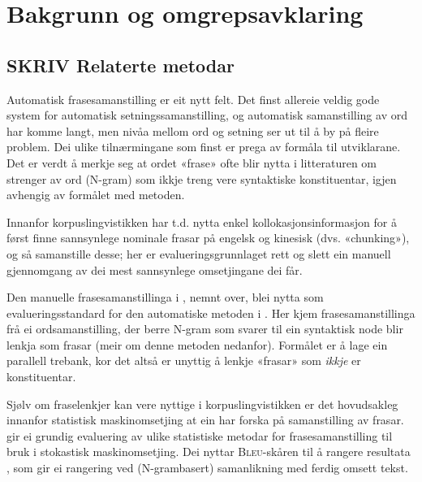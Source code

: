 \documentclass[11pt,a4paper,oneside,draft]{book}
\newcommand{\Bleu}{\textsc{Bleu}}
\begin{document}
\chapter{Bakgrunn og omgrepsavklaring}
\label{sec-2}

  \label{SEC:bakgrunn}

\section{\textbf{SKRIV} Relaterte metodar}
\label{sec-2.1}

Automatisk frasesamanstilling er eit nytt felt. Det finst allereie
veldig gode system for automatisk setningssamanstilling, og automatisk
samanstilling av ord har komme langt, men nivåa mellom ord og setning
ser ut til å by på fleire problem.  Dei ulike tilnærmingane
som finst er prega av formåla til utviklarane. Det er verdt å merkje
seg at ordet «frase» ofte blir nytta i litteraturen om strenger av ord
(N-gram) som ikkje treng vere syntaktiske konstituentar, igjen
avhengig av formålet med metoden.

Innanfor korpuslingvistikken har t.d. \citet{piao2001mwu} nytta enkel
kollokasjonsinformasjon for å først finne sannsynlege nominale frasar
på engelsk og kinesisk (dvs. «chunking»), og så samanstille desse; her
er evalueringsgrunnlaget rett og slett ein manuell gjennomgang av dei
mest sannsynlege omsetjingane dei får. 

Den manuelle frasesamanstillinga i \citet{samuelsson2006pap}, nemnt
over, blei nytta som evalueringsstandard for den automatiske metoden i
\citet{samuelsson2007apa}.  Her kjem frasesamanstillinga frå ei
ordsamanstilling, der berre N-gram som svarer til ein syntaktisk node
blir lenkja som frasar (meir om denne metoden nedanfor). Formålet er å
lage ein parallell trebank, kor det altså er unyttig å lenkje «frasar»
som \emph{ikkje} er konstituentar.

Sjølv om fraselenkjer kan vere nyttige i korpuslingvistikken er det
hovudsakleg innanfor statistisk maskinomsetjing at ein har forska på
samanstilling av frasar. \citet{koehn2003spb} gir ei grundig
evaluering av ulike statistiske metodar for frasesamanstilling til
bruk i stokastisk maskinomsetjing. Dei nyttar \Bleu-skåren til å
rangere resultata
\citep[Papineni~et~al.,~2001,~i][s.~51]{koehn2003spb}, som gir ei
rangering ved (N-grambasert) samanlikning med ferdig omsett tekst.
\end{document}
